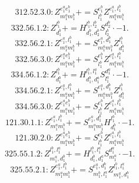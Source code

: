 \documentclass[letterpaper,10pt,fleqn,leqno,onecolumn]{article}
\begin{document}
\begin{equation} \;\;\;\;\;\;  312.52.3.0: Z^{e_{1}^{a}e_{1}^{b}}_{m_{1}^{a}m_{1}^{b}}+=S^{e_{1}^{b}}_{l_{1}^{b}}Z^{e_{1}^{a},l_{1}^{b}}_{m_{1}^{a}m_{1}^{b}} \end{equation}
\begin{equation} \;\;\;\;\;\;  332.56.1.2: Z^{l_{1}^{b}}_{d_{1}^{b}}+=H^{l_{1}^{b},l_{2}^{b}}_{d_{1}^{b},d_{2}^{b}}S^{d_{2}^{b}}_{l_{2}^{b}}\cdot -1. \end{equation}
\begin{equation} \;\;\;\;\;\;  332.56.2.1: Z^{e_{1}^{a},l_{1}^{b}}_{m_{1}^{a}m_{1}^{b}}+=S^{e_{1}^{a},d_{1}^{b}}_{m_{1}^{a}m_{1}^{b}}Z^{l_{1}^{b}}_{d_{1}^{b}} \end{equation}
\begin{equation} \;\;\;\;\;\;  332.56.3.0: Z^{e_{1}^{a}e_{1}^{b}}_{m_{1}^{a}m_{1}^{b}}+=S^{e_{1}^{b}}_{l_{1}^{b}}Z^{e_{1}^{a},l_{1}^{b}}_{m_{1}^{a}m_{1}^{b}} \end{equation}
\begin{equation} \;\;\;\;\;\;  334.56.1.2: Z^{l_{1}^{b}}_{d_{1}^{b}}+=H^{l_{1}^{b},l_{1}^{a}}_{d_{1}^{b},d_{1}^{a}}S^{d_{1}^{a}}_{l_{1}^{a}}\cdot -1. \end{equation}
\begin{equation} \;\;\;\;\;\;  334.56.2.1: Z^{e_{1}^{a},l_{1}^{b}}_{m_{1}^{a}m_{1}^{b}}+=S^{e_{1}^{a},d_{1}^{b}}_{m_{1}^{a}m_{1}^{b}}Z^{l_{1}^{b}}_{d_{1}^{b}} \end{equation}
\begin{equation} \;\;\;\;\;\;  334.56.3.0: Z^{e_{1}^{a}e_{1}^{b}}_{m_{1}^{a}m_{1}^{b}}+=S^{e_{1}^{b}}_{l_{1}^{b}}Z^{e_{1}^{a},l_{1}^{b}}_{m_{1}^{a}m_{1}^{b}} \end{equation}
\begin{equation} \;\;\;\;\;\;  121.30.1.1: Z^{e_{1}^{a},l_{1}^{b}}_{m_{1}^{a}m_{1}^{b}}+=S^{e_{1}^{a},d_{1}^{b}}_{m_{1}^{a}m_{1}^{b}}H^{l_{1}^{b}}_{d_{1}^{b}}\cdot -1. \end{equation}
\begin{equation} \;\;\;\;\;\;  121.30.2.0: Z^{e_{1}^{a}e_{1}^{b}}_{m_{1}^{a}m_{1}^{b}}+=S^{e_{1}^{b}}_{l_{1}^{b}}Z^{e_{1}^{a},l_{1}^{b}}_{m_{1}^{a}m_{1}^{b}} \end{equation}
\begin{equation} \;\;\;\;\;\;  325.55.1.2: Z^{l_{1}^{b},l_{1}^{a}}_{m_{1}^{a},d_{1}^{b}}+=H^{l_{1}^{b},l_{1}^{a}}_{d_{1}^{b},d_{1}^{a}}S^{d_{1}^{a}}_{m_{1}^{a}}\cdot -1. \end{equation}
\begin{equation} \;\;\;\;\;\;  325.55.2.1: Z^{e_{1}^{a},l_{1}^{b}}_{m_{1}^{a}m_{1}^{b}}+=S^{e_{1}^{a},d_{1}^{b}}_{m_{1}^{b},l_{1}^{a}}Z^{l_{1}^{b},l_{1}^{a}}_{m_{1}^{a},d_{1}^{b}} \end{equation}
\end{document}
